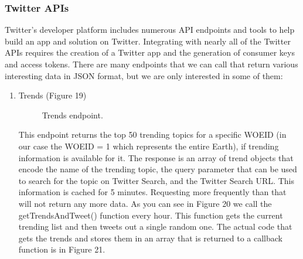 \documentclass[12pt]{article} %
\begin{document}
	\subsubsection{Twitter APIs  \cite{twitterAPI}}
	\noindent Twitter’s developer platform includes numerous API endpoints and tools to help build an app and solution on Twitter.
	Integrating with nearly all of the Twitter APIs requires the creation of a Twitter app and the generation of consumer keys and access tokens.
	There are many endpoints that we can call that return various interesting data in JSON format, but we are only interested in some of them:

	\begin{enumerate}
	
		\item Trends (Figure 19)

		\begin{figure}[H] %
		\caption{Trends endpoint.}
		\label{trendsAPIv2}
		\end{figure}

		This endpoint returns the top 50 trending topics for a specific WOEID \cite{woeid} (in our case the WOEID = 1 which represents the entire Earth), if trending information is 				available for it.
		The response is an array of trend objects that encode the name of the trending topic, the query parameter that can be used to search for the topic on Twitter Search, and 				the Twitter Search URL. This information is cached for 5 minutes. Requesting more frequently than that will not return any more data. As you can see in Figure 20 we call the 			getTrendsAndTweet() function every hour. This function gets the current trending list and then tweets out a single random one. The actual code that gets the trends and 				stores them in an array that is returned to a callback function is in Figure 21.


\end{enumerate}
\end{document}
